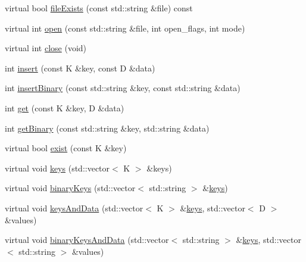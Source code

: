 \begin{DoxyCompactItemize}
\item 
virtual bool \mbox{\hyperlink{classFILEDB_1_1ConfDataStoreDB_aec1d15aa66421b99e7cd1151e12d2f17}{file\+Exists}} (const std\+::string \&file) const
\item 
virtual int \mbox{\hyperlink{classFILEDB_1_1ConfDataStoreDB_ab87e2fb12067bfb19c1f381a433fd442}{open}} (const std\+::string \&file, int open\+\_\+flags, int mode)
\item 
virtual int \mbox{\hyperlink{classFILEDB_1_1ConfDataStoreDB_aa322ea0136b8eacc11df2b5b52b3b6d5}{close}} (void)
\item 
int \mbox{\hyperlink{classFILEDB_1_1ConfDataStoreDB_a9917cff27ec340f88e59ddb9be630ecf}{insert}} (const K \&key, const D \&data)
\item 
int \mbox{\hyperlink{classFILEDB_1_1ConfDataStoreDB_a82fea8d8ac1a2c096614b213087a73d2}{insert\+Binary}} (const std\+::string \&key, const std\+::string \&data)
\item 
int \mbox{\hyperlink{classFILEDB_1_1ConfDataStoreDB_ad89d0c1aef7c82fb0273d50bfea7cf0a}{get}} (const K \&key, D \&data)
\item 
int \mbox{\hyperlink{classFILEDB_1_1ConfDataStoreDB_a971e372585c497dad3b1bc589bc4dd15}{get\+Binary}} (const std\+::string \&key, std\+::string \&data)
\item 
virtual bool \mbox{\hyperlink{classFILEDB_1_1ConfDataStoreDB_afedf2b2ec0b10469cebb72397b02459d}{exist}} (const K \&key)
\item 
virtual void \mbox{\hyperlink{classFILEDB_1_1ConfDataStoreDB_a794e05e3888ab95e0396a196b5a18e65}{keys}} (std\+::vector$<$ K $>$ \&keys)
\item 
virtual void \mbox{\hyperlink{classFILEDB_1_1ConfDataStoreDB_a1d0e8e27cd8fc6b24ece52259d1ab2b0}{binary\+Keys}} (std\+::vector$<$ std\+::string $>$ \&\mbox{\hyperlink{classFILEDB_1_1ConfDataStoreDB_a794e05e3888ab95e0396a196b5a18e65}{keys}})
\item 
virtual void \mbox{\hyperlink{classFILEDB_1_1ConfDataStoreDB_a94333e6aab463fd336bffb28d81dd39d}{keys\+And\+Data}} (std\+::vector$<$ K $>$ \&\mbox{\hyperlink{classFILEDB_1_1ConfDataStoreDB_a794e05e3888ab95e0396a196b5a18e65}{keys}}, std\+::vector$<$ D $>$ \&values)
\item 
virtual void \mbox{\hyperlink{classFILEDB_1_1ConfDataStoreDB_ae38beaf9ba3f8629f2c322a3c5a23357}{binary\+Keys\+And\+Data}} (std\+::vector$<$ std\+::string $>$ \&\mbox{\hyperlink{classFILEDB_1_1ConfDataStoreDB_a794e05e3888ab95e0396a196b5a18e65}{keys}}, std\+::vector$<$ std\+::string $>$ \&values)
\item 

\end{DoxyCompactItemize}
